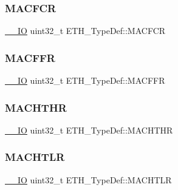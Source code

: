 \mbox{\label{struct_e_t_h___type_def_acdbe493d9d68ddfed4c758f0a7bde058}} 
\subsubsection{\texorpdfstring{MACFCR}{MACFCR}}
{\footnotesize\ttfamily \mbox{\hyperlink{group___c_m_s_i_s___c_m3__core__definitions_gaec43007d9998a0a0e01faede4133d6be}{\+\_\+\+\_\+\+IO}} uint32\+\_\+t E\+T\+H\+\_\+\+Type\+Def\+::\+M\+A\+C\+F\+CR}

\mbox{\label{struct_e_t_h___type_def_afdf573860dd5dcd13f2b6b19dcb92cc1}} 
\subsubsection{\texorpdfstring{MACFFR}{MACFFR}}
{\footnotesize\ttfamily \mbox{\hyperlink{group___c_m_s_i_s___c_m3__core__definitions_gaec43007d9998a0a0e01faede4133d6be}{\+\_\+\+\_\+\+IO}} uint32\+\_\+t E\+T\+H\+\_\+\+Type\+Def\+::\+M\+A\+C\+F\+FR}

\mbox{\label{struct_e_t_h___type_def_ace541cc94118ec2db7c930a44960aa18}} 
\subsubsection{\texorpdfstring{MACHTHR}{MACHTHR}}
{\footnotesize\ttfamily \mbox{\hyperlink{group___c_m_s_i_s___c_m3__core__definitions_gaec43007d9998a0a0e01faede4133d6be}{\+\_\+\+\_\+\+IO}} uint32\+\_\+t E\+T\+H\+\_\+\+Type\+Def\+::\+M\+A\+C\+H\+T\+HR}

\mbox{\label{struct_e_t_h___type_def_a22bd30c653a4c1c8f46a59e0a821dcf8}} 
\subsubsection{\texorpdfstring{MACHTLR}{MACHTLR}}
{\footnotesize\ttfamily \mbox{\hyperlink{group___c_m_s_i_s___c_m3__core__definitions_gaec43007d9998a0a0e01faede4133d6be}{\+\_\+\+\_\+\+IO}} uint32\+\_\+t E\+T\+H\+\_\+\+Type\+Def\+::\+M\+A\+C\+H\+T\+LR}

